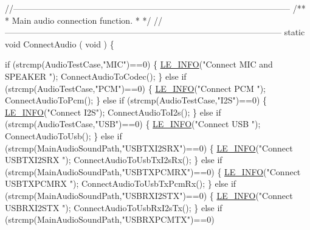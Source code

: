 \begin{DoxyCodeInclude}
{{{{{{{{{{{\textcolor{comment}{//--------------------------------------------------------------------------------------------------}\textcolor{comment}{}
\textcolor{comment}{/**}
\textcolor{comment}{ * Main audio connection function.}
\textcolor{comment}{ *}
\textcolor{comment}{ */}
\textcolor{comment}{//--------------------------------------------------------------------------------------------------}
\textcolor{keyword}{static} \textcolor{keywordtype}{void} ConnectAudio
(
    \textcolor{keywordtype}{void}
)
\{

    \textcolor{keywordflow}{if} (strcmp(AudioTestCase,\textcolor{stringliteral}{"MIC"})==0)
    \{
        \hyperlink{le__log_8h_a23e6d206faa64f612045d688cdde5808}{LE\_INFO}(\textcolor{stringliteral}{"Connect MIC and SPEAKER "});
        ConnectAudioToCodec();
    \}
    \textcolor{keywordflow}{else} \textcolor{keywordflow}{if} (strcmp(AudioTestCase,\textcolor{stringliteral}{"PCM"})==0)
    \{
        \hyperlink{le__log_8h_a23e6d206faa64f612045d688cdde5808}{LE\_INFO}(\textcolor{stringliteral}{"Connect PCM "});
        ConnectAudioToPcm();
    \}
    \textcolor{keywordflow}{else} \textcolor{keywordflow}{if} (strcmp(AudioTestCase,\textcolor{stringliteral}{"I2S"})==0)
    \{
        \hyperlink{le__log_8h_a23e6d206faa64f612045d688cdde5808}{LE\_INFO}(\textcolor{stringliteral}{"Connect I2S"});
        ConnectAudioToI2s();
    \}
    \textcolor{keywordflow}{else} \textcolor{keywordflow}{if} (strcmp(AudioTestCase,\textcolor{stringliteral}{"USB"})==0)
    \{
        \hyperlink{le__log_8h_a23e6d206faa64f612045d688cdde5808}{LE\_INFO}(\textcolor{stringliteral}{"Connect USB "});
        ConnectAudioToUsb();
    \}
    \textcolor{keywordflow}{else} \textcolor{keywordflow}{if} (strcmp(MainAudioSoundPath,\textcolor{stringliteral}{"USBTXI2SRX"})==0)
    \{
        \hyperlink{le__log_8h_a23e6d206faa64f612045d688cdde5808}{LE\_INFO}(\textcolor{stringliteral}{"Connect USBTXI2SRX "});
        ConnectAudioToUsbTxI2sRx();
    \}
    \textcolor{keywordflow}{else} \textcolor{keywordflow}{if} (strcmp(MainAudioSoundPath,\textcolor{stringliteral}{"USBTXPCMRX"})==0)
    \{
        \hyperlink{le__log_8h_a23e6d206faa64f612045d688cdde5808}{LE\_INFO}(\textcolor{stringliteral}{"Connect USBTXPCMRX "});
        ConnectAudioToUsbTxPcmRx();
    \}
    \textcolor{keywordflow}{else} \textcolor{keywordflow}{if} (strcmp(MainAudioSoundPath,\textcolor{stringliteral}{"USBRXI2STX"})==0)
    \{
        \hyperlink{le__log_8h_a23e6d206faa64f612045d688cdde5808}{LE\_INFO}(\textcolor{stringliteral}{"Connect USBRXI2STX "});
        ConnectAudioToUsbRxI2sTx();
    \}
    \textcolor{keywordflow}{else} \textcolor{keywordflow}{if} (strcmp(MainAudioSoundPath,\textcolor{stringliteral}{"USBRXPCMTX"})==0)
}}}}}}}}}}}
\end{DoxyCodeInclude}
